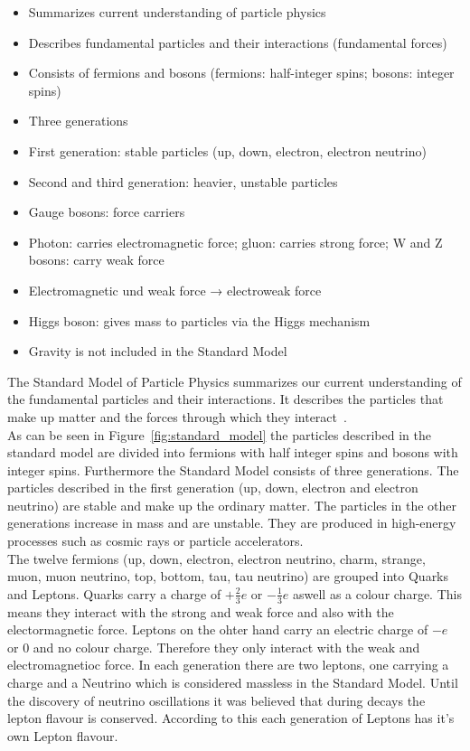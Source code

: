 \begin{itemize}[noitemsep]
    \item Summarizes current understanding of particle physics
    \item Describes fundamental particles and their interactions (fundamental forces)
    \item Consists of fermions and bosons (fermions: half-integer spins; bosons: integer spins)
    \item Three generations
    \item First generation: stable particles (up, down, electron, electron neutrino)
    \item Second and third generation: heavier, unstable particles
    \item Gauge bosons: force carriers
    \item Photon: carries electromagnetic force; gluon: carries strong force; W and Z bosons: carry weak force
    \item Electromagnetic und weak force → electroweak force
    \item Higgs boson: gives mass to particles via the Higgs mechanism
    \item Gravity is not included in the Standard Model
\end{itemize}
The Standard Model of Particle Physics summarizes our current understanding of the fundamental particles and their interactions. 
It describes the particles that make up matter and the forces through which they interact~\cite{thomson2013modern}.\\
As can be seen in Figure~\ref{fig:standard_model} the particles described in the standard model are divided into fermions with half integer spins and bosons with integer spins. 
Furthermore the Standard Model consists of three generations. The particles described in the first generation (up, down, electron and electron neutrino) are stable and make up the ordinary matter. The particles in the other generations increase in mass and are unstable. They are produced in high-energy processes such as cosmic rays or particle accelerators.\\
The twelve  fermions (up, down, electron, electron neutrino, charm, strange, muon, muon neutrino, top, bottom, tau, tau neutrino) are grouped into Quarks and Leptons. 
Quarks carry a charge of $+\frac{2}{3}e$ or $-\frac{1}{3}e$ aswell as a colour charge. This means they interact with the strong and weak force and also with the electormagnetic force. 
Leptons on the ohter hand carry an electric charge of $-e$ or $0$ and no colour charge. Therefore they only interact with the weak and electromagnetioc force. In each generation there are two leptons, one carrying a charge and a Neutrino which is considered massless in the Standard Model. Until the discovery of neutrino oscillations it was believed that during decays the lepton flavour is conserved. According to this each generation of Leptons has it's own Lepton flavour. 
